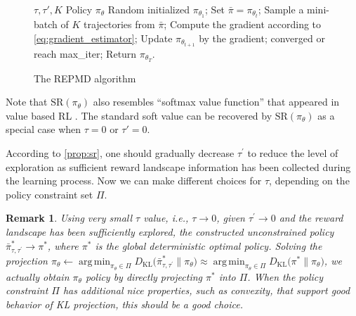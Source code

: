 \documentclass{article}
\DeclareMathOperator*\argmin{arg\,min}
\newcommand*{\refPi}{\bar{\pi}}
\newcommand{\KL}{D_{\text{KL}}}
\newcommand{\pithetat}{\pi_{\theta_t}}
\newtheorem{remk}{Remark}
\begin{document}
\begin{figure}
    \begin{minipage}{0.5\textwidth}
      \begin{algorithm}[H]
  \caption{\label{alg:repmd}  The REPMD algorithm}
 \begin{algorithmic}[1]
  \INPUT $\tau, \tau', K$
  \OUTPUT  Policy $\pi_\theta$
  \STATE Random initialized $\pi_{\theta_1}$;
  \STATE Set $\refPi = \pithetat$;
  \REPEAT 
  \STATE Sample a mini-batch of $K$ trajectories from $\refPi$;
  \STATE Compute the gradient according to \cref{eq:gradient_estimator};
  \STATE Update $\pi_{\theta_{t+1}}$ by the gradient;
  \UNTIL converged or reach max\_iter;
  \ENDFOR
  \STATE Return $\pi_{\theta_T}$.
 \end{algorithmic}
\end{algorithm}
    \end{minipage}
  \end{figure}
  
Note that $\text{SR}(\pi_\theta)$ also resembles ``softmax value function'' that appeared in value based RL \cite{nachum2017bridging,haarnoja2018soft,NIPS2017_6874}. The standard soft value can be recovered by $\text{SR}(\pi_\theta)$ as a special case when $\tau = 0$ or $\tau'=0$. 

According to \cref{prop:sr}, one should gradually decrease $\tau^{\prime}$ to reduce the level of exploration as sufficient reward landscape information has been collected during the learning process. Now we can make different choices for $\tau$, depending on the policy constraint set $\Pi$.

\begin{remk}
	\label{small_tau_choices}
	Using very small $\tau$ value, i.e., $\tau \to 0$, given $\tau^{\prime} \to 0$ and the reward landscape has been sufficiently explored, the constructed unconstrained policy $\bar{\pi}_{\tau,\tau^{\prime}}^* \to \pi^*$, where $\pi^*$ is the global deterministic optimal policy. Solving the projection $\pi_\theta \leftarrow \argmin_{\pi_\theta \in \Pi}{\KL(\bar{\pi}_{\tau,\tau^{\prime}}^* \| \pi_\theta}) \approx \argmin_{\pi_\theta \in \Pi}{\KL(\pi^* \| \pi_\theta})$, we actually obtain $\pi_\theta$ policy by directly projecting $\pi^*$ into $\Pi$. When the policy constraint $\Pi$ has additional nice properties, such as convexity, that support good behavior of KL projection, this should be a good choice.
\end{remk}
  
\end{document}
